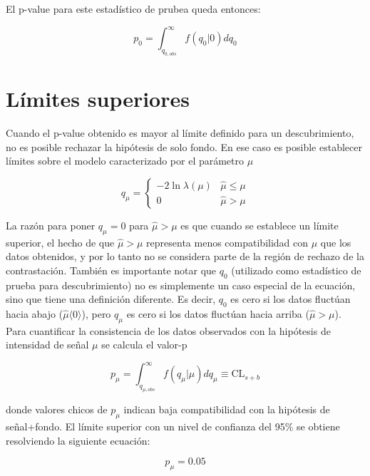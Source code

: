 El p-value para este estadístico de prubea queda entonces:

\begin{equation}
	p_0 = \int_{q_{0, obs}}^{\infty} f(q_0|0)dq_0
\end{equation}


\section{Límites superiores}

Cuando el p-value obtenido es mayor al límite definido para un descubrimiento, no es posible rechazar la hipótesis de solo fondo. En ese caso es posible establecer límites sobre el modelo caracterizado por el parámetro $\mu$

\begin{equation}
	q_{\mu}=
	\begin{cases}
		-2\ln{\lambda(\mu)} & \hat{\mu}\le\mu\\
		0 & \hat{\mu}>\mu
	\end{cases}
\end{equation}


La razón para poner $q_{\mu} = 0$ para $\hat{\mu}>\mu$ es que cuando se establece un límite superior, el hecho
de que $\hat{\mu}>\mu$ representa menos compatibilidad con $\mu$ que los datos obtenidos, y por lo tanto no se
considera parte de la región de rechazo de la contrastación.
También es importante notar que $q_0$ (utilizado como estadístico de prueba para descubrimiento) no
es simplemente un caso especial de la ecuación, sino que tiene una definición diferente. Es decir,
$q_0$ es cero si los datos fluctúan hacia abajo ($\hat{\mu}\langle 0\rangle$), pero $q_{\mu}$ es cero si los datos fluctúan hacia arriba
($\hat{\mu}>\mu$).
Para cuantificar la consistencia de los datos observados con la hipótesis de intensidad de señal $\mu$ se
calcula el valor-p


\begin{equation}
	p_{\mu} = \int_{q_{\mu, obs}}^{\infty} f(q_\mu|\mu)dq_\mu \equiv \text{CL}_{s+b}
\end{equation}



donde valores chicos de $p_{\mu}$ indican baja compatibilidad con la hipótesis de señal+fondo.
El límite superior con un nivel de confianza del 95\% se obtiene resolviendo la siguiente ecuación:

\begin{equation}
	p_{\mu} = 0.05
\end{equation}

